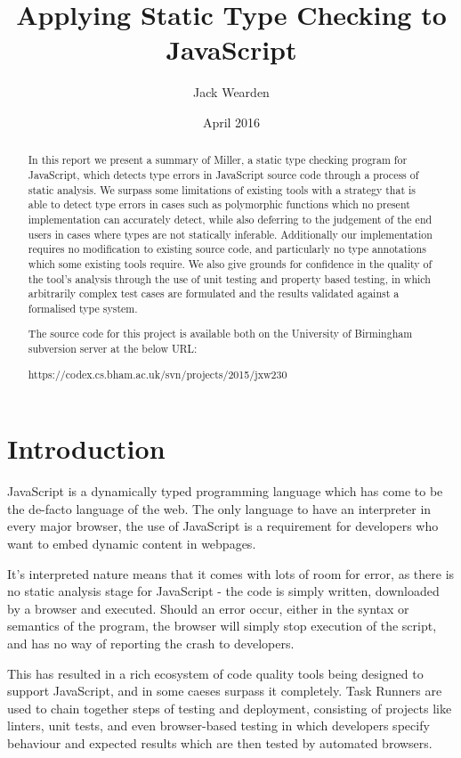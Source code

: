 \documentclass[british, twoside]{bhamthesis}
\title{Applying Static Type Checking to JavaScript}
\author{Jack Wearden}
\date{April 2016}  %
\theoremstyle{definition}
\begin{document}
\maketitle

\begin{abstract}
  In this report we present a summary of Miller, a static type checking program for JavaScript, which detects type errors in JavaScript source code through a process of static analysis. We surpass some limitations of existing tools with a strategy that is able to detect type errors in cases such as polymorphic functions which no present implementation can accurately detect, while also deferring to the judgement of the end users in cases where types are not statically inferable. Additionally our implementation requires no modification to existing source code, and particularly no type annotations which some existing tools require. We also give grounds for confidence in the quality of the tool's analysis through the use of unit testing and property based testing, in which arbitrarily complex test cases are formulated and the results validated against a formalised type system.

  The source code for this project is available both on the University of Birmingham subversion server at the below URL:

    https://codex.cs.bham.ac.uk/svn/projects/2015/jxw230
\end{abstract}

\tableofcontents

\chapter{Introduction}

  JavaScript is a dynamically typed programming language which has come to be the de-facto language of the web. The only language to have an interpreter in every major browser, the use of JavaScript is a requirement for developers who want to embed dynamic content in webpages.

  It's interpreted nature means that it comes with lots of room for error, as there is no static analysis stage for JavaScript - the code is simply written, downloaded by a browser and executed. Should an error occur, either in the syntax or semantics of the program, the browser will simply stop execution of the script, and has no way of reporting the crash to developers.

  This has resulted in a rich ecosystem of code quality tools being designed to support JavaScript, and in some caeses surpass it completely. Task Runners are used to chain together steps of testing and deployment, consisting of projects like linters, unit tests, and even browser-based testing in which developers specify behaviour and expected results which are then tested by automated browsers.
\end{document}
